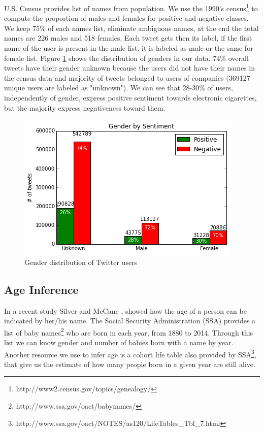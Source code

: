 \documentclass{sig-alternate}
\begin{document}
U.S. Census provides list of names from population. We use the 1990's census\footnote{http://www2.census.gov/topics/genealogy/} to compute the proportion of males and females for positive and negative classes. We keep 75\% of each names list, eliminate ambiguous names, at the end the total names are 226 males and 518 females. Each tweet gets then its label, if the first name of the user is present in the male list, it is labeled as male or the same for female list. Figure \ref{figura:gender} shows the distribution of genders in our data. 74\% overall tweets have their gender unknown because the users did not have their names in the census data and majority of tweets belonged to users of companies (369127 unique users are labeled as "unknown"). We can see that 28-30\% of users, independently of gender, express positive sentiment towards electronic cigarettes, but the majority express negativeness toward them.
\begin{figure}[t]
\includegraphics[width=\columnwidth]{gender.png}
\centering
\caption{ Gender distribution of Twitter users}
\label{figura:gender}
\end{figure}

\subsection{Age Inference}

In a recent study Silver and McCanc \cite{silver2014how}, showed how the age of a person can be indicated by her/his name. The Social Security Administration (SSA) provides a list of baby names\footnote{http://www.ssa.gov/oact/babynames/} who are born in each year, from 1880 to 2014. Through this list we can know gender and number of babies born with a name by year. Another resource we use to infer age is a cohort life table also provided by SSA\footnote{http://www.ssa.gov/oact/NOTES/as120/LifeTables\_Tbl\_7.html}, that give us the estimate of how many people born in a given year are still alive. 
\end{document}
